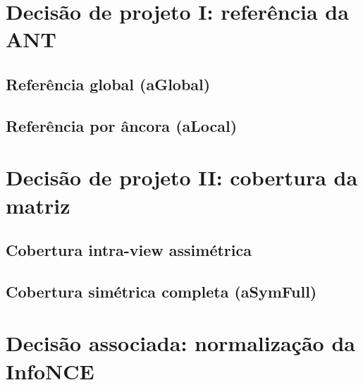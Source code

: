 \section{Decisão de projeto I: referência da ANT}

\subsection{Referência global (aGlobal)}

\subsection{Referência por âncora (aLocal)}


\section{Decisão de projeto II: cobertura da matriz}

\subsection{Cobertura intra-view assimétrica}

\subsection{Cobertura simétrica completa (aSymFull)}


\section{Decisão associada: normalização da InfoNCE}

